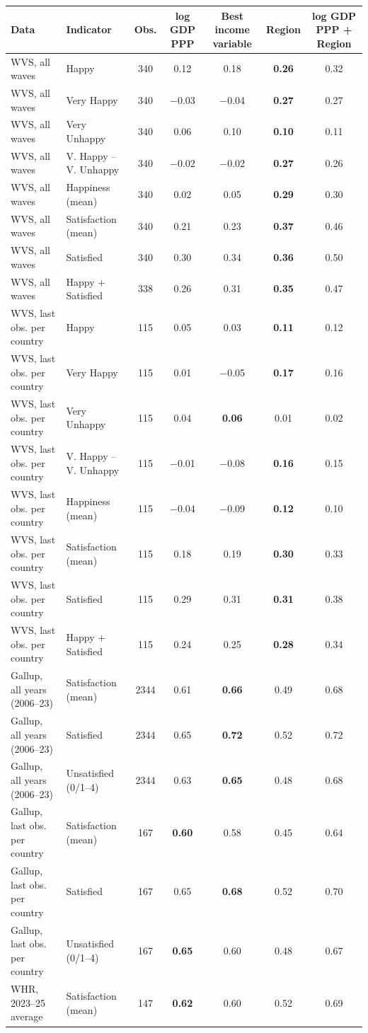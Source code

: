 \begin{tabular}{llccccc}
\toprule
Data & Indicator & Obs. & log GDP PPP & Best income variable & Region & log GDP PPP + Region \\
\midrule
WVS, all waves & Happy & 340 & 0.12 & 0.18 & \textbf{0.26} & 0.32 \\
WVS, all waves & Very Happy & 340 & \ensuremath{-}0.03 & \ensuremath{-}0.04 & \textbf{0.27} & 0.27 \\
WVS, all waves & Very Unhappy & 340 & 0.06 & 0.10 & \textbf{0.10} & 0.11 \\
WVS, all waves & V. Happy -- V. Unhappy & 340 & \ensuremath{-}0.02 & \ensuremath{-}0.02 & \textbf{0.27} & 0.26 \\
WVS, all waves & Happiness (mean) & 340 & 0.02 & 0.05 & \textbf{0.29} & 0.30 \\
WVS, all waves & Satisfaction (mean) & 340 & 0.21 & 0.23 & \textbf{0.37} & 0.46 \\
WVS, all waves & Satisfied & 340 & 0.30 & 0.34 & \textbf{0.36} & 0.50 \\
WVS, all waves & Happy + Satisfied & 338 & 0.26 & 0.31 & \textbf{0.35} & 0.47 \\
\midrule
WVS, last obs. per country & Happy & 115 & 0.05 & 0.03 & \textbf{0.11} & 0.12 \\
WVS, last obs. per country & Very Happy & 115 & 0.01 & \ensuremath{-}0.05 & \textbf{0.17} & 0.16 \\
WVS, last obs. per country & Very Unhappy & 115 & 0.04 & \textbf{0.06} & 0.01 & 0.02 \\
WVS, last obs. per country & V. Happy -- V. Unhappy & 115 & \ensuremath{-}0.01 & \ensuremath{-}0.08 & \textbf{0.16} & 0.15 \\
WVS, last obs. per country & Happiness (mean) & 115 & \ensuremath{-}0.04 & \ensuremath{-}0.09 & \textbf{0.12} & 0.10 \\
WVS, last obs. per country & Satisfaction (mean) & 115 & 0.18 & 0.19 & \textbf{0.30} & 0.33 \\
WVS, last obs. per country & Satisfied & 115 & 0.29 & 0.31 & \textbf{0.31} & 0.38 \\
WVS, last obs. per country & Happy + Satisfied & 115 & 0.24 & 0.25 & \textbf{0.28} & 0.34 \\
\midrule
Gallup, all years (2006--23) & Satisfaction (mean) & 2344 & 0.61 & \textbf{0.66} & 0.49 & 0.68 \\
Gallup, all years (2006--23) & Satisfied & 2344 & 0.65 & \textbf{0.72} & 0.52 & 0.72 \\
Gallup, all years (2006--23) & Unsatisfied (0/1--4) & 2344 & 0.63 & \textbf{0.65} & 0.48 & 0.68 \\
\midrule
Gallup, last obs. per country & Satisfaction (mean) & 167 & \textbf{0.60} & 0.58 & 0.45 & 0.64 \\
Gallup, last obs. per country & Satisfied & 167 & 0.65 & \textbf{0.68} & 0.52 & 0.70 \\
Gallup, last obs. per country & Unsatisfied (0/1--4) & 167 & \textbf{0.65} & 0.60 & 0.48 & 0.67 \\
\midrule
WHR, 2023--25 average & Satisfaction (mean) & 147 & \textbf{0.62} & 0.60 & 0.52 & 0.69 \\
\bottomrule
\end{tabular}
